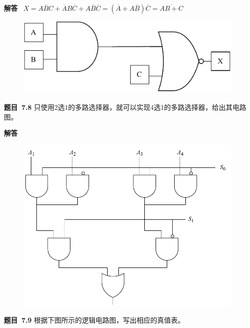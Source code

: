\documentclass[10pt,a4paper,UTF8]{ctexart}
\newcommand{\problemname}{待定义}
\newenvironment{problem}{\begin{shaded}\par\noindent\textbf{题目\  \problemname}}{\end{shaded}\par}
\newenvironment{solution}{\par\noindent\textbf{解答}\ }{\par}
\begin{document}
\begin{solution}
	$X=\overline{ABC}+\overline{A}B\overline{C}+A\overline{B}\overline{C}=(\overline{A}+A\overline{B})\overline{C}=\overline{AB+C}$
	\begin{figure}[H]
		\centering
		\includegraphics[scale=0.7]{img/7.7.pdf}
	\end{figure}
\end{solution}


\renewcommand{\problemname}{7.8}
\begin{problem}
	只使用2选1的多路选择器，就可以实现4选1的多路选择器，给出其电路图。
\end{problem}

\begin{solution}
	\begin{figure}[H]
		\centering
		\includegraphics[scale=0.5]{img/7.8.pdf}
	\end{figure}

\end{solution}


\renewcommand{\problemname}{7.9}
\begin{problem}
	根据下图所示的逻辑电路图，写出相应的真值表。
\end{problem}
\end{document}
